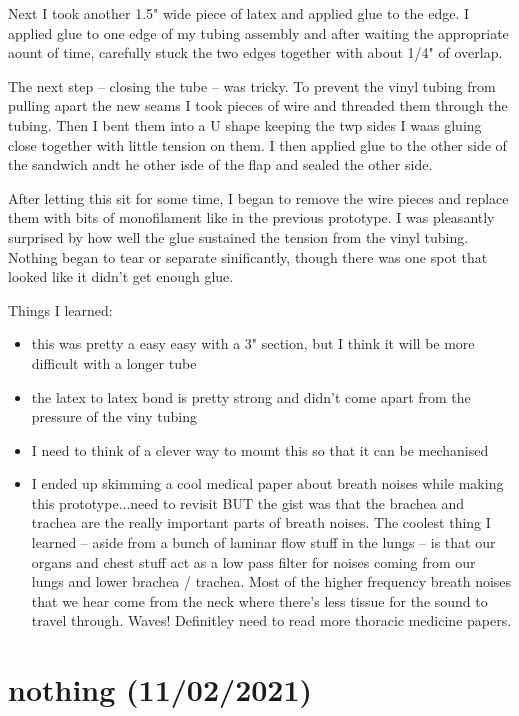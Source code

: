 \documentclass[11pt]{report}
\begin{document}
Next I took another 1.5" wide piece of latex and applied glue to the edge. I applied glue to one edge of my tubing assembly and after waiting the appropriate aount of time, carefully stuck the two edges together with about 1/4" of overlap. 

The next step -- closing the tube -- was tricky. To prevent the vinyl tubing from pulling apart the new seams I took pieces of wire and threaded them through the tubing. Then I bent them into a U shape keeping the twp sides I waas gluing close together with little tension on them. I then applied glue to the other side of the sandwich andt he other isde of the flap and sealed the other side. 

After letting this sit for some time, I began to remove the wire pieces and replace them with bits of monofilament like in the previous prototype. I was pleasantly surprised by how well the glue sustained the tension from the vinyl tubing. Nothing began to tear or separate sinificantly, though there was one spot that looked like it didn't get enough glue.


Things I learned:
\begin{itemize}
\item
  this was pretty a easy easy with a 3" section, but I think it will be more difficult with a longer tube
\item
  the latex to latex bond is pretty strong and didn't come apart from the pressure of the viny tubing
\item
  I need to think of a clever way to mount this so that it can be mechanised
\item
  I ended up skimming a cool medical paper about breath noises while making this prototype...need to revisit BUT the gist was that the brachea and trachea are the really important parts of breath noises. The coolest thing I learned -- aside from a bunch of laminar flow stuff in the lungs -- is that our organs and chest stuff act as a low pass filter for noises coming from our lungs and lower brachea / trachea. Most of the higher frequency breath noises that we hear come from the neck where there's less tissue for the sound to travel through. Waves! Definitley need to read more thoracic medicine papers.
\end{itemize}

\clearpage
\section*{nothing (11/02/2021)}
\end{document}

